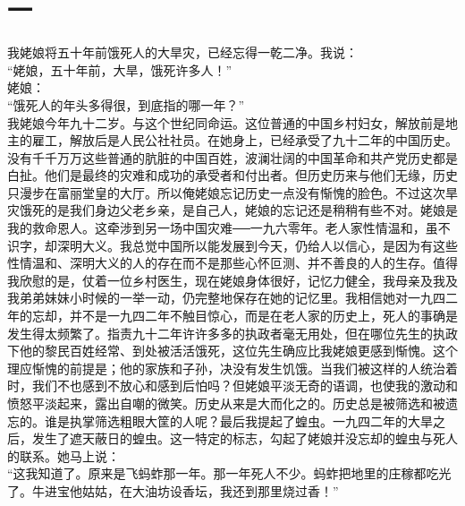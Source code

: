 \fancyhead[RO]{\thepage} %
\fancyhead[LE]{\thepage} %
\fancyfoot[LE,RO]{}
\fancyfoot[LO,CE]{}
\fancyfoot[CO,RE]{}
\chapter*{一}
我姥娘将五十年前饿死人的大旱灾，已经忘得一乾二净。我说：\\

“姥娘，五十年前，大旱，饿死许多人！”\\

姥娘：\\

“饿死人的年头多得很，到底指的哪一年？”\\

我姥娘今年九十二岁。与这个世纪同命运。这位普通的中国乡村妇女，解放前是地主的雇工，解放后是人民公社社员。在她身上，已经承受了九十二年的中国历史。没有千千万万这些普通的肮脏的中国百姓，波澜壮阔的中国革命和共产党历史都是白扯。他们是最终的灾难和成功的承受者和付出者。但历史历来与他们无缘，历史只漫步在富丽堂皇的大厅。所以俺姥娘忘记历史一点没有惭愧的脸色。不过这次旱灾饿死的是我们身边父老乡亲，是自己人，姥娘的忘记还是稍稍有些不对。姥娘是我的救命恩人。这牵涉到另一场中国灾难{\Add ──}一九六零年。老人家性情温和，虽不识字，却深明大义。我总觉中国所以能发展到今天，仍给人以信心，是因为有这些性情温和、深明大义的人的存在而不是那些心怀叵测、并不善良的人的生存。值得我欣慰的是，仗着一位乡村医生，现在姥娘身体很好，记忆力健全，我母亲及我及我弟弟妹妹小时候的一举一动，仍完整地保存在她的记忆里。我相信她对一九四二年的忘却，并不是一九四二年不触目惊心，而是在老人家的历史上，死人的事确是发生得太频繁了。指责九十二年许许多多的执政者毫无用处，但在哪位先生的执政下他的黎民百姓经常、到处被活活饿死，这位先生确应比我姥娘更感到惭愧。这个理应惭愧的前提是；他的家族和子孙，决没有发生饥饿。当我们被这样的人统治着时，我们不也感到不放心和感到后怕吗？但姥娘平淡无奇的语调，也使我的激动和愤怒平淡起来，露出自嘲的微笑。历史从来是大而化之的。历史总是被筛选和被遗忘的。谁是执掌筛选粗眼大筐的人呢？最后我提起了蝗虫。一九四二年的大旱之后，发生了遮天蔽日的蝗虫。这一特定的标志，勾起了姥娘并没忘却的蝗虫与死人的联系。她马上说：\\

“这我知道了。原来是飞蚂蚱那一年。那一年死人不少。蚂蚱把地里的庄稼都吃光了。牛进宝他姑姑，在大油坊设香坛，我还到那里烧过香！”\\

